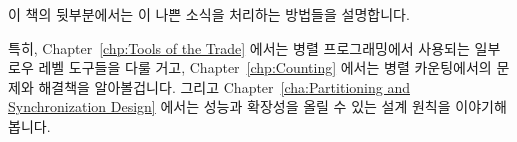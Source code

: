 이 책의 뒷부분에서는 이 나쁜 소식을 처리하는 방법들을 설명합니다.
\iffalse

The remainder of this book describes ways of handling this bad news.
\fi

특히, Chapter~\ref{chp:Tools of the Trade} 에서는 병렬 프로그래밍에서 사용되는
일부 로우 레벨 도구들을 다룰 거고, Chapter~\ref{chp:Counting} 에서는 병렬
카운팅에서의 문제와 해결책을 알아볼겁니다. 그리고
Chapter~\ref{cha:Partitioning and Synchronization Design} 에서는 성능과
확장성을 올릴 수 있는 설계 원칙을 이야기해 봅니다.
\iffalse

In particular,
Chapter~\ref{chp:Tools of the Trade} will cover some of the low-level
tools used for parallel programming,
Chapter~\ref{chp:Counting} will investigate problems and solutions to
parallel counting, and
Chapter~\ref{cha:Partitioning and Synchronization Design}
will discuss design disciplines that promote performance and scalability.
\fi

